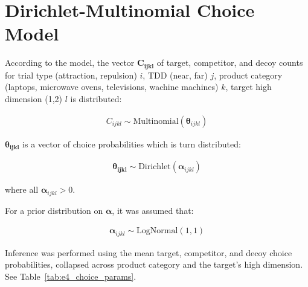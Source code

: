 \section{Dirichlet-Multinomial Choice Model}

According to the model, the vector $\boldsymbol{C_{ijkl}}$ of target, competitor, and decoy counts for trial type (attraction, repulsion) $i$, TDD (near, far) $j$, product category (laptops, microwave ovens, televisions, wachine machines)  $k$, target high dimension (1,2) $l$ is distributed:

\begin{align}
    C_{ijkl} \sim \text{Multinomial}(\boldsymbol{\theta}_{ijkl})
\end{align}

$\boldsymbol{\theta_{ijkl}}$ is a vector of choice probabilities which is turn distributed:

\begin{align}
    \boldsymbol{\theta_{ijkl}} \sim \text{Dirichlet}(\boldsymbol{\alpha}_{ijkl})
\end{align}

where all $\boldsymbol{\alpha}_{ijkl}>0$. 

For a prior distribution on $\boldsymbol{\alpha}$, it was assumed that:

\begin{align}
    \boldsymbol{\alpha}_{ijkl} \sim \text{LogNormal}(1,1)
\end{align}

Inference was performed using the mean target, competitor, and decoy choice probabilities, collapsed across product category and the target's high dimension. See Table~\ref{tab:e4_choice_params}.

